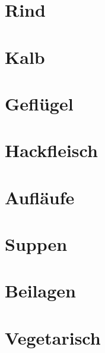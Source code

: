 \documentclass[11pt, DIV=15, twoside=false]{scrbook}
\begin{document}
\newcommand\x{1} %

\tableofcontents

\part{Rind}





\part{Kalb}


\part{Geflügel}



\part{Hackfleisch}


\part{Aufläufe}


\part{Suppen}




\part{Beilagen}


\part{Vegetarisch}


\end{document}
